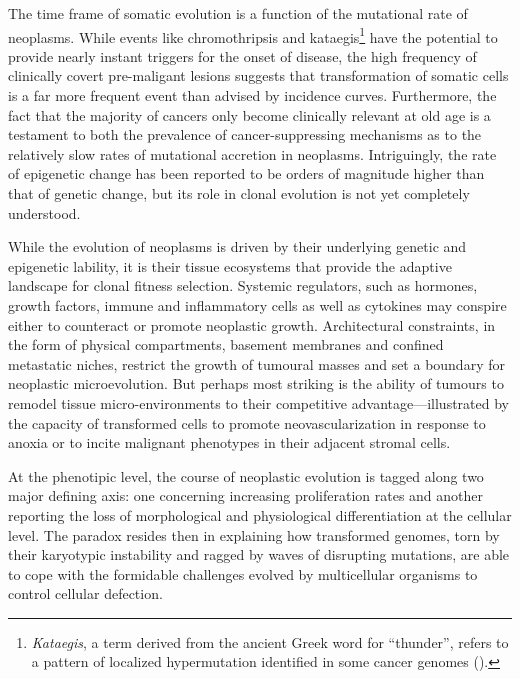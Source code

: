 The time frame of somatic evolution is a function of the mutational rate of
neoplasms.  While events like chromothripsis and
kataegis\footnote{\emph{Kataegis}, a term derived from the ancient Greek word
  for ``thunder'', refers to a pattern of localized hypermutation identified in
  some cancer genomes (\mbox{\citealp{nik-zainal_mutational_2012}}).} have the
potential to provide nearly instant triggers for the onset of disease, the high
frequency of clinically covert \mbox{pre-maligant}
lesions\cite{sakr_frequency_1993} suggests that transformation of somatic cells
is a far more frequent event than advised by incidence curves.  Furthermore, the
fact that the majority of cancers only become clinically relevant at old age is
a testament to both the prevalence of cancer-suppressing mechanisms as to the
relatively slow rates of mutational accretion in neoplasms.  Intriguingly, the
rate of epigenetic change has been reported to be orders of magnitude higher
than that of genetic change,\cite{siegmund_inferring_2009} but its role in
clonal evolution is not yet completely understood.


While the evolution of neoplasms is driven by their underlying genetic and
epigenetic lability, it is their tissue ecosystems that provide the adaptive
landscape for clonal fitness selection.\cite{greaves_clonal_2012} Systemic
regulators, such as hormones, growth factors, immune and inflammatory cells as
well as cytokines may conspire either to counteract or promote neoplastic
growth.\cite{bierie_tumour_2006,hanahan_hallmarks_2011} Architectural
constraints, in the form of physical compartments, basement membranes and
confined metastatic niches, restrict the growth of tumoural masses and set a
boundary for neoplastic microevolution.  But perhaps most striking is the
ability of tumours to remodel tissue micro-environments to their competitive
advantage---illustrated by the capacity of transformed cells to promote
neovascularization in response to anoxia or to incite malignant phenotypes in
their adjacent stromal cells.\cite{lathia_deadly_2011}

At the phenotipic level, the course of neoplastic evolution is tagged along two
major defining axis: one concerning increasing proliferation rates and another
reporting the loss of morphological and physiological differentiation at the
cellular level.\cite{tarabichi_systems_2013}  The paradox resides then in
explaining how transformed genomes, torn by their karyotypic instability and
ragged by waves of disrupting mutations, are able to cope with the formidable
challenges evolved by multicellular organisms to control cellular defection.

